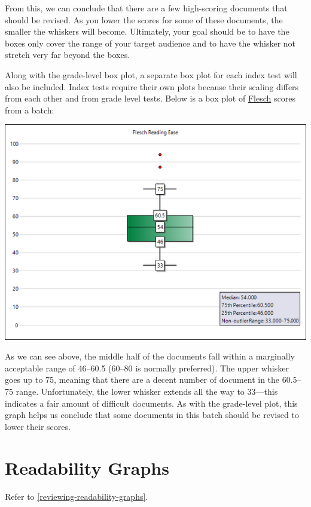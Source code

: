 \documentclass[
]{book}
\theoremstyle{definition}
\theoremstyle{definition}
\theoremstyle{definition}
\theoremstyle{definition}
\theoremstyle{remark}
\begin{document}
From this, we can conclude that there are a few high-scoring documents that should be revised. As you lower the scores for some of these documents, the smaller the whiskers will become. Ultimately, your goal should be to have the boxes only cover the range of your target audience and to have the whisker not stretch very far beyond the boxes.

Along with the grade-level box plot, a separate box plot for each index test will also be included. Index tests require their own plots because their scaling differs from each other and from grade level tests. Below is a box plot of \protect\hyperlink{flesch-test}{Flesch} scores from a batch:

\includegraphics{Images/boxindex.png}

As we can see above, the middle half of the documents fall within a marginally acceptable range of 46--60.5 (60--80 is normally preferred). The upper whisker goes up to 75, meaning that there are a decent number of document in the 60.5--75 range. Unfortunately, the lower whisker extends all the way to 33---this indicates a fair amount of difficult documents. As with the grade-level plot, this graph helps us conclude that some documents in this batch should be revised to lower their scores.

\hypertarget{batch-readability-graphs}{%
\section{Readability Graphs}\label{batch-readability-graphs}}

Refer to \ref{reviewing-readability-graphs}.
\end{document}
